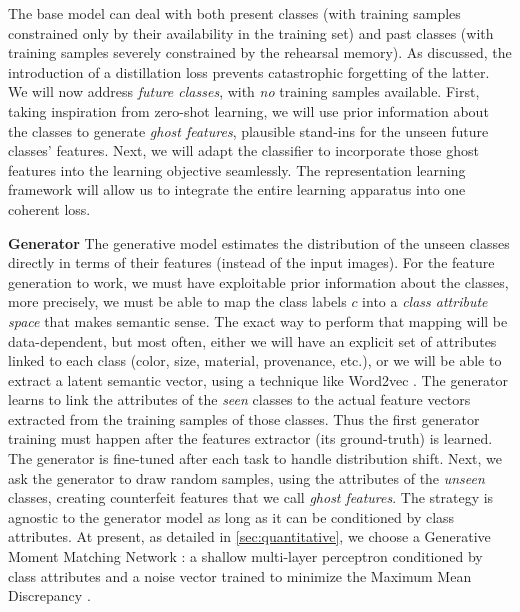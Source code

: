 The base model can deal with both present classes (with training samples constrained only by their
availability in the training set)  and past classes (with training samples severely constrained by
the rehearsal memory). As discussed, the introduction of a distillation loss prevents catastrophic
forgetting of the latter. We will now address \textit{future classes}, with \textit{no} training
samples available. First, taking inspiration from zero-shot learning, we will use prior information
about the classes to generate \textit{ghost features}, plausible stand-ins for the unseen future
classes' features. Next, we will adapt the classifier to incorporate those ghost features into the
learning objective seamlessly. The representation learning framework will allow us to integrate the
entire learning apparatus into one coherent loss.

\textbf{Generator} The generative model estimates the distribution of the unseen classes directly
in terms of their features (instead of the input images). For the feature generation to work, we
must have exploitable prior information about the classes, more precisely, we must be able to map
the class labels $c$ into a \textit{class attribute space} that makes semantic sense. The exact way
to perform that mapping will be data-dependent, but most often, either we will have an explicit set
of attributes linked to each class (color, size, material, provenance, etc.), or we will be able to
extract a latent semantic vector, using a technique like Word2vec
\cite{mikolov2013word2vec,pennington2014glove}. The generator learns to link the attributes of the
\textit{seen} classes to the actual feature vectors extracted from the training samples of those
classes. Thus the first generator training must happen after the features extractor (its
ground-truth) is learned. The generator is fine-tuned after each task to handle distribution shift.
Next, we ask the generator to draw random samples, using the attributes of the \textit{unseen}
classes, creating counterfeit features that we call \textit{ghost features}. The strategy is
agnostic to the generator model as long as it can be conditioned by class attributes.  At present,
as detailed in \autoref{sec:quantitative}, we choose a Generative Moment Matching Network
\cite{li2015gmmn}: a shallow multi-layer perceptron conditioned by class attributes and a noise
vector trained to minimize the Maximum Mean Discrepancy
\cite{gretton2007twosampleMMD,gretton2012twosampletestMMD}.

\label{sec:generator}


